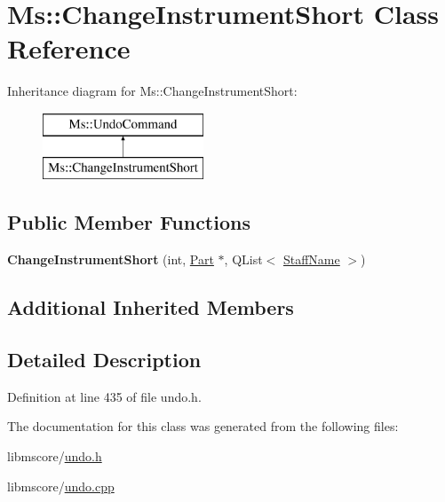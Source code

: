 \hypertarget{class_ms_1_1_change_instrument_short}{}\section{Ms\+:\+:Change\+Instrument\+Short Class Reference}
\label{class_ms_1_1_change_instrument_short}
Inheritance diagram for Ms\+:\+:Change\+Instrument\+Short\+:\begin{figure}[H]
\begin{center}
\leavevmode
\includegraphics[height=2.000000cm]{class_ms_1_1_change_instrument_short}
\end{center}
\end{figure}
\subsection*{Public Member Functions}
\begin{DoxyCompactItemize}
\item 
\mbox{\label{class_ms_1_1_change_instrument_short_a80199928050b4d828ac53a6890c31d00}} 
{\bfseries Change\+Instrument\+Short} (int, \hyperlink{class_ms_1_1_part}{Part} $\ast$, Q\+List$<$ \hyperlink{class_ms_1_1_staff_name}{Staff\+Name} $>$)
\end{DoxyCompactItemize}
\subsection*{Additional Inherited Members}


\subsection{Detailed Description}


Definition at line 435 of file undo.\+h.



The documentation for this class was generated from the following files\+:\begin{DoxyCompactItemize}
\item 
libmscore/\hyperlink{undo_8h}{undo.\+h}\item 
libmscore/\hyperlink{undo_8cpp}{undo.\+cpp}\end{DoxyCompactItemize}
